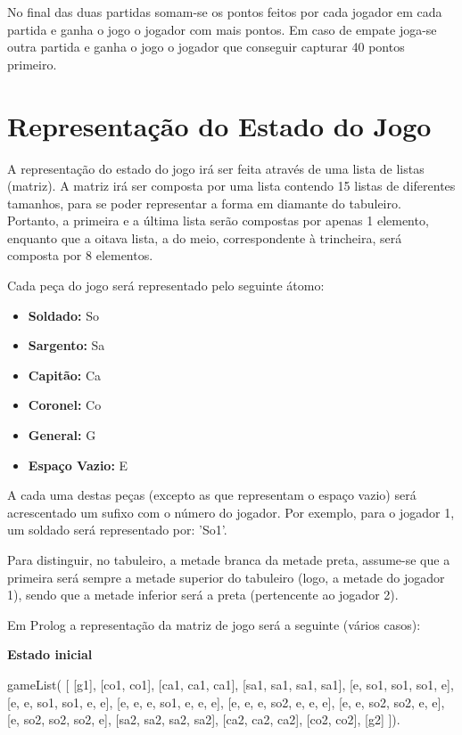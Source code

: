 No final das duas partidas somam-se os pontos feitos por cada jogador em cada partida e ganha o jogo o jogador com mais pontos. Em caso de empate joga-se outra partida e ganha o jogo o jogador que conseguir capturar 40 pontos primeiro.

\newpage

\section{Representação do Estado do Jogo}

A representação do estado do jogo irá ser feita através de uma lista de listas (matriz).
A matriz irá ser composta por uma lista contendo 15 listas de diferentes tamanhos, para se poder representar a forma em diamante do tabuleiro.
Portanto, a primeira e a última lista serão compostas por apenas 1 elemento, enquanto que a oitava lista, a do meio, correspondente à trincheira, será composta por 8 elementos.

Cada peça do jogo será representado pelo seguinte átomo:

\begin{itemize}
  \item{\textbf{Soldado:} So}
  \item {\textbf{Sargento:} Sa}
  \item{\textbf{Capitão:} Ca}
  \item{\textbf{Coronel:} Co}
  \item{\textbf{General:} G}
  \item{\textbf{Espaço Vazio:} E}
\end{itemize}

A cada uma destas peças (excepto as que representam o espaço vazio) será acrescentado um sufixo com o número do jogador.
Por exemplo, para o jogador 1, um soldado será representado por: 'So1'.

Para distinguir, no tabuleiro, a metade branca da metade preta, assume-se que a primeira
será sempre a metade superior do tabuleiro (logo, a metade do jogador 1),
sendo que a metade inferior será a preta (pertencente ao jogador 2).

Em Prolog a representação da matriz de jogo será a seguinte (vários casos):

\vspace{1cm}

\textbf{Estado inicial}

gameList( [ [g1],
    [co1, co1],
    [ca1, ca1, ca1],
    [sa1, sa1, sa1, sa1],
    [e, so1, so1, so1, e],
    [e, e, so1, so1, e, e],
    [e, e, e, so1, e, e, e],
    [e, e, e, so2, e, e, e],
    [e, e, so2, so2, e, e],
    [e, so2, so2, so2, e],
    [sa2, sa2, sa2, sa2],
    [ca2, ca2, ca2],
    [co2, co2],
     [g2]  ]).


